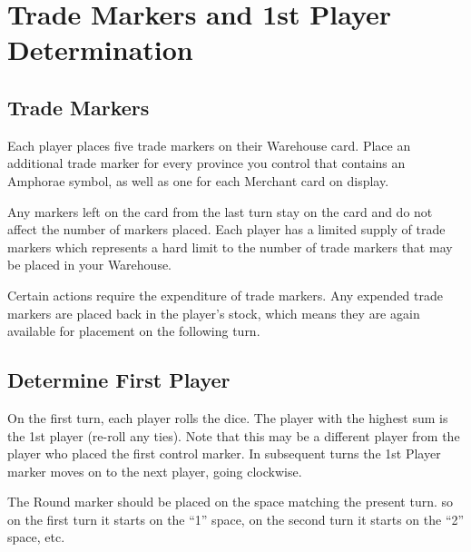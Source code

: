 \section{Trade Markers and 1st Player Determination}

\subsection{Trade Markers}

Each player places five trade markers on their Warehouse card. Place an additional trade marker for every province you control that contains an Amphorae symbol, as well as one for each Merchant card on display.

Any markers left on the card from the last turn stay on the card and do not affect the number of markers placed. Each player has a limited supply of trade markers which represents a hard limit to the number of trade markers that may be placed in your Warehouse.

Certain actions require the expenditure of trade markers. Any expended trade markers are placed back in the player’s stock, which means they are again available for placement on the following turn.

\subsection{Determine First Player}

On the first turn, each player rolls the dice. The player with the highest sum is the 1st player (re-roll any ties). Note that this may be a different player from the player who placed the first control marker. In subsequent turns the 1st Player marker moves on to the next player, going clockwise.

The Round marker should be placed on the space matching the present turn. so on the first turn it starts on the “1” space, on the second turn it starts on the “2” space, etc.